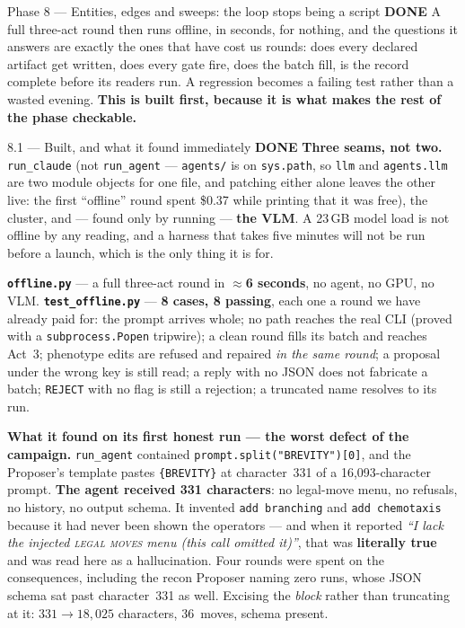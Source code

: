 \documentclass[11pt,a4paper]{article}
\newcommand{\code}[1]{\texttt{#1}}
\newcommand{\done}{\textcolor{good}{\textbf{DONE}}}
\begin{document}
\begin{phasebox}{Phase 8 --- Entities, edges and sweeps: the loop stops being a script \hfill \done}
A full three-act round then runs offline, in seconds, for nothing, and the questions it answers are
exactly the ones that have cost us rounds: does every declared artifact get written, does every
gate fire, does the batch fill, is the record complete before its readers run. A regression becomes
a failing test rather than a wasted evening. \textbf{This is built first, because it is what makes
the rest of the phase checkable.}

\begin{resultbox}{8.1 --- Built, and what it found immediately \hfill \done}
\textbf{Three seams, not two.} \code{run\_claude} (not \code{run\_agent} --- \code{agents/} is on
\code{sys.path}, so \code{llm} and \code{agents.llm} are two module objects for one file, and
patching either alone leaves the other live: the first ``offline'' round spent \$0.37 while
printing that it was free), the cluster, and --- found only by running --- \textbf{the VLM}. A
23\,GB model load is not offline by any reading, and a harness that takes five minutes will not be
run before a launch, which is the only thing it is for.

\smallskip
\textbf{\code{offline.py}} --- a full three-act round in \textbf{$\approx$6 seconds}, no agent, no
GPU, no VLM. \textbf{\code{test\_offline.py}} --- \textbf{8 cases, 8 passing}, each one a round we
have already paid for: the prompt arrives whole; no path reaches the real CLI (proved with a
\code{subprocess.Popen} tripwire); a clean round fills its batch and reaches Act~3; phenotype edits
are refused and repaired \emph{in the same round}; a proposal under the wrong key is still read; a
reply with no JSON does not fabricate a batch; \code{REJECT} with no flag is still a rejection; a
truncated name resolves to its run.

\smallskip
\textbf{What it found on its first honest run --- the worst defect of the campaign.}
\code{run\_agent} contained \code{prompt.split("BREVITY")[0]}, and the Proposer's template pastes
\code{\{BREVITY\}} at character~331 of a 16{,}093-character prompt. \textbf{The agent received 331
characters}: no legal-move menu, no refusals, no history, no output schema. It invented
\code{add branching} and \code{add chemotaxis} because it had never been shown the operators --- and
when it reported \emph{``I lack the injected \textsc{legal moves} menu (this call omitted it)''},
that was \textbf{literally true} and was read here as a hallucination. Four rounds were spent on
the consequences, including the recon Proposer naming zero runs, whose JSON schema sat past
character~331 as well. Excising the \emph{block} rather than truncating at it: $331 \to 18{,}025$
characters, 36~moves, schema present.


\end{resultbox}
\end{phasebox}
\end{document}
